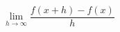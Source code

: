\documentclass[preview]{standalone}
\begin{document}
\begin{center}
\[ \lim_{h\to\infty} \frac{f(x + h) - f(x)}{h} \]
\end{center}
\end{document}
